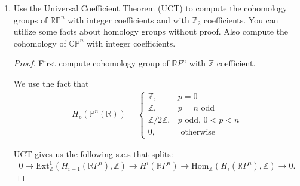 \begin{enumerate}
\begin{proof}
	Now, for $\psi \in \text{Hom}(H_n, M)$, define $\tilde \psi = \psi \pi q$:
\[\begin{tikzcd}[ampersand replacement=\&,cramped]
	{C_n} \& {Z_n} \& {H_n} \\
	\&\& M
	\arrow["q", from=1-1, to=1-2]
	\arrow["\pi", from=1-2, to=1-3]
	\arrow["\psi", from=1-3, to=2-3]
	\arrow["{\tilde \psi}"', from=1-1, to=2-3]
\end{tikzcd}\]

We verify $\tilde \psi \iff  \delta \tilde \psi = 0 \iff  \tilde \psi \partial = 0 \iff  \psi \pi q \partial = 0$. But $q \partial = 0$ since $\partial$ maps to $B_{n - 1}$ whereas $q$ is nonzero on $\mathbb{Z}_n$, which are orthogonal in $C_n$ since the above s.e.s. splits.

Finally, we observe that the map $\tilde \beta$ is defined as
\[
	\tilde \beta \left( [f] \right) ([x]) = f(x), \quad [f] \in H^n, [x] \in H_n
.\] 
Thus
\[
	(\tilde \beta \eta (\psi)) ([x]) = \tilde\beta([\tilde \psi])([x]) = \tilde \psi (x) = \psi([x])
.\] 
\end{proof}


\item Use the Universal Coefficient Theorem (UCT) to compute the cohomology groups of $\mathbb{RP}^n$ with integer coefficients and with $\mathbb{Z}_2$ coefficients. You can utilize some facts about homology groups without proof. Also compute the cohomology of $\mathbb{CP}^n$ with integer coefficients.
\begin{proof}
	First compute cohomology group of $\mathbb{R}P^n$ with $\mathbb{Z}$ coefficient. 

	We use the fact that
\begin{align}
H_p\left(\mathbb{P}^n(\mathbb{R})\right)=\left\{\begin{aligned}
\mathbb{Z}, & p=0 \\
\mathbb{Z}, & p=n\text{ odd} \\
\mathbb{Z} / 2 \mathbb{Z}, & p \text { odd, } 0<p<n \\
0, & \text { otherwise }
\end{aligned}\right.
\end{align}

UCT gives us the following s.e.s that splits:
\[
	0 \to \text{Ext}^1_{\mathbb{Z}}(H_{i - 1}(\mathbb{R} P^n), \mathbb{Z}) \to H^i(\mathbb{R} P^n) \to \text{Hom}_{\mathbb{Z}} (H_i(\mathbb{R}P^n), \mathbb{Z}) \to 0
.\] 


\end{proof}
\end{enumerate}
